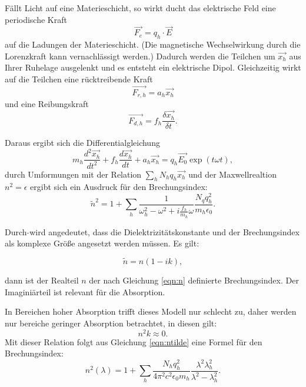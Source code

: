 Fällt Licht auf eine Materieschicht, so wirkt ducht das elektrische Feld eine
periodische Kraft
\begin{equation}
  \vec{F_e}=q_h\cdot \vec{E}
\end{equation}
auf die Ladungen der Materieschicht. (Die magnetische Wechselwirkung durch
die Lorenzkraft kann vernachlässigt werden.)
Dadurch werden die Teilchen um $\vec{x_h}$ aus Ihrer Ruhelage ausgelenkt und es entsteht
ein elektrische Dipol.
Gleichzeitig wirkt auf die Teilchen eine rücktreibende Kraft
\begin{equation}
  \vec{F_{r,h}}=a_h \vec{x_h}
\end{equation}
und eine Reibungskraft
\begin{equation}
  \vec{F_{d,h}}=f_h \frac{\delta \vec{x_h}}{\delta t}.
\end{equation}

Daraus ergibt sich die Differentialgleichung
\begin{equation}
  m_h\frac{d^{2}\vec{x_h}}{dt^{2}}+f_h\frac{d\vec{x_h}}{dt}+a_h\vec{x_h}=q_h\vec{E_0}\exp{(t\omega t)},
\end{equation}
durch Umformungen mit der Relation $\sum_{h}{N_h q_h \vec{x_h}}$ und der
Maxwellrealtion $n^{2}=\epsilon$ ergibt sich
ein Ausdruck für den Brechungsindex:
\begin{equation}
  \tilde{n}^2=1+ \sum_{h} \frac{1}{\omega^{2}_h - \omega^{2}+i\frac{f_h}{m_h}\omega}
  \frac{N_q q^{2}_h}{m_h \epsilon_0}.
  \label{ntilde}
\end{equation}

Durch $\tilde{}$\;wird angedeutet, dass die Dielektrizitätskonstante und der
Brechungsindex als komplexe Größe angesetzt werden müssen. Es gilt:

\begin{equation}
  \tilde{n}= n(1-ik),
\end{equation}

dann ist der Realteil $n$ der nach Gleichung \ref{eqn:n} definierte Brechungsindex.
Der Imaginiärteil ist relevant für die Absorption.

In Bereichen hoher Absorption trifft dieses Modell nur schlecht zu, daher
werden nur bereiche geringer Absorption betrachtet, in diesen gilt:
\begin{equation}
  n^{2}k\approx 0.
\end{equation}
 Mit dieser Relation folgt aus Gleichung \ref{eqn:ntilde} eine Formel für den
 Brechungsindex:
 \begin{equation}
   n^{2}(\lambda)= 1+ \sum_{h}\frac{N_h q^{2}_h}{4\pi^{2}c^2 \epsilon_0 m_h}
   \frac{\lambda^2 \lambda^{2}_h}{\lambda^2 - \lambda^{2}_h}.
   \label{eqn:nquadrat}
 \end{equation}

